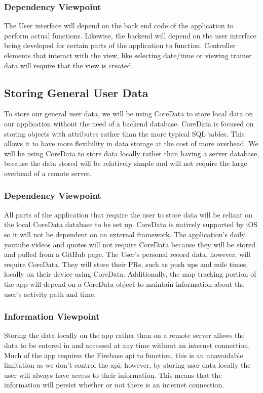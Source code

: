 \documentclass[letterpaper,10pt,titlepage]{article}
\begin{document}
\subsubsection{Dependency Viewpoint}
The User interface will depend on the back end code of the application to perform actual functions. Likewise, the backend will depend on the user interface being developed for certain parts of the application to function. Controller elements that interact with the view, like selecting date/time or viewing trainer data will require that the view is created.



\subsection{Storing General User Data}
To store our general user data, we will be using CoreData to store local data on our application without the need of a backend database. CoreData is focused on storing objects with attributes rather than the more typical SQL tables. This allows it to have more flexibility in data storage at the cost of more overhead. We will be using CoreData to store data locally rather than having a server database, because the data stored will be relatively simple and will not require the large overhead of a remote server.

\subsubsection{Dependency Viewpoint}
All parts of the application that require the user to store data will be reliant on the local CoreData database to be set up. CoreData is natively supported by iOS so it will not be dependent on an external framework. The application’s daily youtube videos and quotes will not require CoreData because they will be stored and pulled from a GitHub page. The User’s personal record data, however, will require CoreData. They will store their PRs, such as push ups and mile times, locally on their device using CoreData. Additionally, the map tracking portion of the app will depend on a CoreData object to maintain information about the user’s activity path and time.

\subsubsection{Information Viewpoint}
Storing the data locally on the app rather than on a remote server allows the data to be entered in and accessed at any time without an internet connection. Much of the app requires the Firebase api to function, this is an unavoidable limitation as we don’t control the api; however, by storing user data locally the user will always have access to their information. This means that the information will persist whether or not there is an internet connection.
\end{document}

